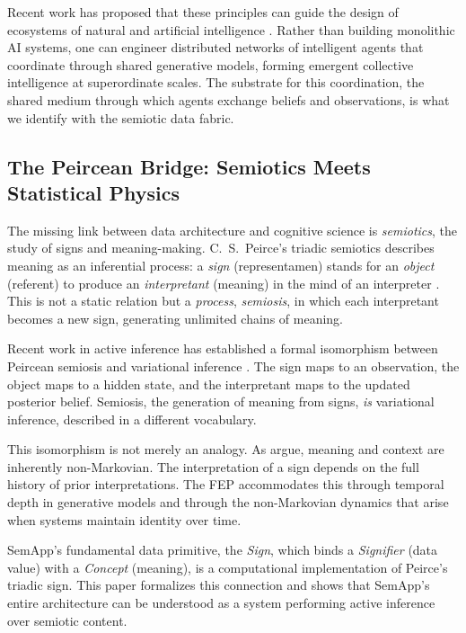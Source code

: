 \documentclass[11pt,a4paper]{article}
\theoremstyle{definition}
\begin{document}
Recent work has proposed that these principles can guide the design of ecosystems of natural and artificial intelligence \citep{friston2022ecosystems}. Rather than building monolithic AI systems, one can engineer distributed networks of intelligent agents that coordinate through shared generative models, forming emergent collective intelligence at superordinate scales. The substrate for this coordination, the shared medium through which agents exchange beliefs and observations, is what we identify with the semiotic data fabric.

\subsection{The Peircean Bridge: Semiotics Meets Statistical Physics}
\label{sec:peirce_intro}

The missing link between data architecture and cognitive science is \emph{semiotics}, the study of signs and meaning-making. C.~S.~Peirce's triadic semiotics describes meaning as an inferential process: a \emph{sign} (representamen) stands for an \emph{object} (referent) to produce an \emph{interpretant} (meaning) in the mind of an interpreter \citep{peirce1931collected}. This is not a static relation but a \emph{process}, \emph{semiosis}, in which each interpretant becomes a new sign, generating unlimited chains of meaning.

Recent work in active inference has established a formal isomorphism between Peircean semiosis and variational inference \citep{constant2019regimes, ramstead2016cultural, albarracin2022epistemic}. The sign maps to an observation, the object maps to a hidden state, and the interpretant maps to the updated posterior belief. Semiosis, the generation of meaning from signs, \emph{is} variational inference, described in a different vocabulary.

This isomorphism is not merely an analogy. As \citet{albarracin2025nonmarkovian} argue, meaning and context are inherently non-Markovian. The interpretation of a sign depends on the full history of prior interpretations. The FEP accommodates this through temporal depth in generative models and through the non-Markovian dynamics that arise when systems maintain identity over time.

SemApp's fundamental data primitive, the \emph{Sign}, which binds a \emph{Signifier} (data value) with a \emph{Concept} (meaning), is a computational implementation of Peirce's triadic sign. This paper formalizes this connection and shows that SemApp's entire architecture can be understood as a system performing active inference over semiotic content.
\end{document}
